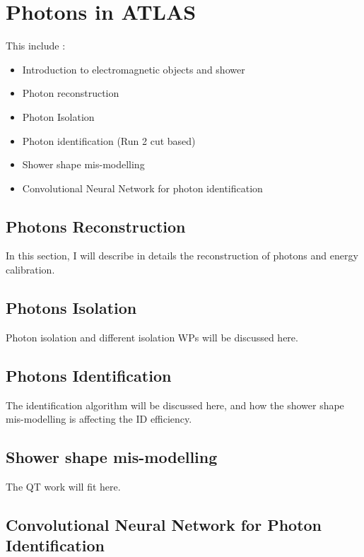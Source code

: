 \newpage
\chapter{Photons in ATLAS}
\label{gamma}

This include :
\begin{itemize}
    \item Introduction to electromagnetic objects and shower 
    \item Photon reconstruction 
    \item Photon Isolation 
    \item Photon identification (Run 2 cut based)
    \item Shower shape mis-modelling 
    \item Convolutional Neural Network for photon identification
\end{itemize}

\section{Photons Reconstruction}
\label{gamma:PR}

In this section, I will describe in details the reconstruction of photons and energy calibration.

\section{Photons Isolation}
\label{gamma:Iso}

Photon isolation and different isolation WPs will be discussed here.

\section{Photons Identification}
\label{gamma:ID}

The identification algorithm will be discussed here, and how the shower shape mis-modelling is affecting the ID efficiency.

\section{Shower shape mis-modelling}
\label{gamma:ss}

The QT work will fit here. 

\section{Convolutional Neural Network for Photon Identification}
\label{gamma:CNN}


